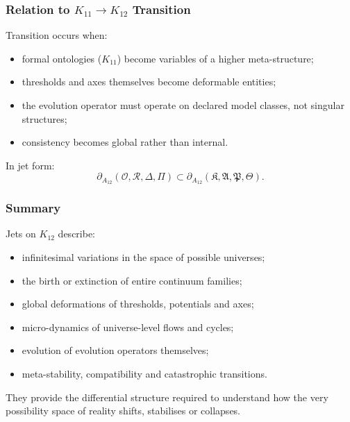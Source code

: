 \subsubsection{Relation to $K_{11} \to K_{12}$ Transition}

Transition occurs when:
\begin{itemize}
    \item formal ontologies ($K_{11}$) become variables of a higher
          meta-structure;
    \item thresholds and axes themselves become deformable entities;
    \item the evolution operator must operate on declared model classes,
          not singular structures;
    \item consistency becomes global rather than internal.
\end{itemize}

In jet form:
\[
\partial_{A_{12}}(\mathcal{O},\mathcal{R},\Delta,\Pi) 
\subset
\partial_{A_{12}}(\mathfrak{K},\mathfrak{A},\mathfrak{P},\mathfrak{\Theta}).
\]


\subsubsection{Summary}

Jets on $K_{12}$ describe:
\begin{itemize}
    \item infinitesimal variations in the space of possible universes;
    \item the birth or extinction of entire continuum families;
    \item global deformations of thresholds, potentials and axes;
    \item micro-dynamics of universe-level flows and cycles;
    \item evolution of evolution operators themselves;
    \item meta-stability, compatibility and catastrophic transitions.
\end{itemize}

They provide the differential structure required to understand how the
very possibility space of reality shifts, stabilises or collapses.
